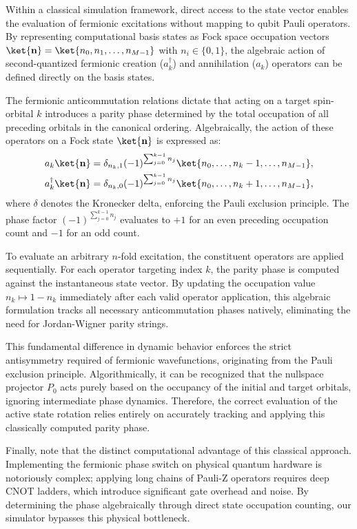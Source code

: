 Within a classical simulation framework, direct access to the state vector enables the evaluation of fermionic excitations without mapping to qubit Pauli operators. By representing computational basis states as Fock space occupation vectors $\ket{\mathbf{n}} = \ket{n_0, n_1, \dots, n_{M-1}}$ with $n_i \in \{0, 1\}$, the algebraic action of second-quantized fermionic creation ($a_k^\dagger$) and annihilation ($a_k$) operators can be defined directly on the basis states.

The fermionic anticommutation relations dictate that acting on a target spin-orbital $k$ introduces a parity phase determined by the total occupation of all preceding orbitals in the canonical ordering. Algebraically, the action of these operators on a Fock state $\ket{\mathbf{n}}$ is expressed as:
\begin{align} \label{eq:annhiliation-creation-algebraic-definition}
	a_k \ket{\mathbf{n}} &= \delta_{n_k, 1} (-1)^{\sum_{j=0}^{k-1} n_j} \ket{n_0, \dots, n_k - 1, \dots, n_{M-1}}, \\
	a_k^\dagger \ket{\mathbf{n}} &= \delta_{n_k, 0} (-1)^{\sum_{j=0}^{k-1} n_j} \ket{n_0, \dots, n_k + 1, \dots, n_{M-1}},
\end{align}
where $\delta$ denotes the Kronecker delta, enforcing the Pauli exclusion principle. The phase factor $(-1)^{\sum_{j=0}^{k-1} n_j}$ evaluates to $+1$ for an even preceding occupation count and $-1$ for an odd count.

To evaluate an arbitrary $n$-fold excitation, the constituent operators are applied sequentially. For each operator targeting index $k$, the parity phase is computed against the instantaneous state vector. By updating the occupation value $n_k \mapsto 1 - n_k$ immediately after each valid operator application, this algebraic formulation tracks all necessary anticommutation phases natively, eliminating the need for Jordan-Wigner parity strings.

This fundamental difference in dynamic behavior enforces the strict antisymmetry required of fermionic wavefunctions, originating from the Pauli exclusion principle. Algorithmically, it can be recognized that the nullspace projector $P_0$ acts purely based on the occupancy of the initial and target orbitals, ignoring intermediate phase dynamics. Therefore, the correct evaluation of the active state rotation relies entirely on accurately tracking and applying this classically computed parity phase.

Finally, note that the distinct computational advantage of this classical approach. Implementing the fermionic phase switch on physical quantum hardware is notoriously complex; applying long chains of Pauli-Z operators requires deep CNOT ladders, which introduce significant gate overhead and noise. By determining the phase algebraically through direct state occupation counting, our simulator bypasses this physical bottleneck.

